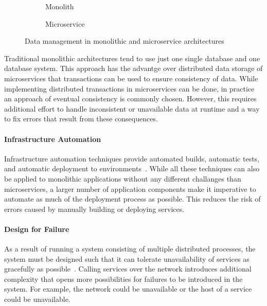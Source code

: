\begin{figure}[!htb]
    \centering
    \begin{subfigure}{.5\textwidth}
        \centering
        
        \caption{Monolith}
        \label{fig:sub1}
    \end{subfigure}%
    \begin{subfigure}{.5\textwidth}
        \centering
        
        \caption{Microservice}
        \label{fig:sub2}
    \end{subfigure}
    \caption{Data management in monolithic and microservice architectures~\cite{Lewis2014}}
    \label{fig:test}
\end{figure}

Traditional monolithic architectures tend to use just one single database and one database system.
This approach has the advantge over distributed data storage of microservices that transactions can be used to ensure consistency of data.
While implementing distributed transactions in microservices can be done, in practice an approach of eventual consistency is commonly chosen.
However, this requires additional effort to handle inconsistent or unavailable data at runtime and a way to fix errors that result from these consequences. 

\paragraph{Infrastructure Automation}

Infrastructure automation techniques provide automated builds, automatic tests, and automatic deployment to environments~\cite{Lewis2014}.
While all these techniques can also be applied to monolithic applications without any different challanges than microservices, a larger number of application components make it imperative to automate as much of the deployment process as possible.
This reduces the risk of errors caused by manually building or deploying services.

\paragraph{Design for Failure}

As a result of running a system consisting of multiple distributed processes, the system must be designed such that it can tolerate unavailability of services as gracefully as possible~\cite{Lewis2014}.
Calling services over the network introduces additional complexity that opens more possibilities for failures to be introduced in the system.
For example, the network could be unavailable or the host of a service could be unavailable.

